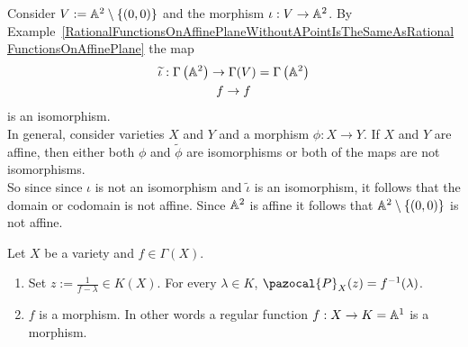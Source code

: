     \begin{example}\label{NonExampleOfAffineVariety}
        Consider $V:=\mathbb{A}^2\setminus\{(0,0)\}$ and the morphism $\iota: V\rightarrow \mathbb{A}^2$. By Example~\ref{RationalFunctionsOnAffinePlaneWithoutAPointIsTheSameAsRationalFunctionsOnAffinePlane} the map 
        \begin{gather*}
            \widetilde{\iota}: \Gamma\left(\mathbb{A}^2\right) \rightarrow \Gamma(V)=\Gamma\left(\mathbb{A}^2\right)\\
            f \rightarrow f
        \end{gather*}
        is an isomorphism.\\ 
        In general, consider varieties $X$ and $Y$ and a morphism $\phi: X\rightarrow Y$. If $X$ and $Y$ are affine, then either both $\phi$ and $\widetilde{\phi}$ are isomorphisms or both of the maps are not isomorphisms.\\
        So since since $\iota$ is not an isomorphism and $\widetilde{\iota}$ is an isomorphism, it follows that the domain or codomain is not affine. Since $\mathbb{A}^2$ is affine it follows that $\mathbb{A}^2\setminus \{(0,0)\}$ is not affine.    
     \end{example}
     \begin{lemma}
        Let $X$ be a variety and $f\in \Gamma(X)$.
        \begin{enumerate}
            \item Set $z:= \frac{1}{f-\lambda}\in K(X)$. For every $\lambda\in K$, $\pazocal{P}_X(z)=f^{-1}(\lambda)$.
            \item $f$ is a morphism. In other words a regular function $f:X\rightarrow K=\mathbb{A}^1$ is a morphism. 
        \end{enumerate}
    \end{lemma}
